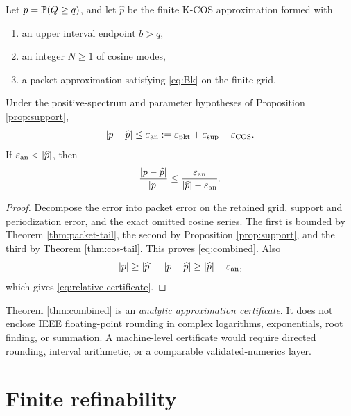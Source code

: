 \begin{theorem}
\label{thm:combined}
Let $p=\mathbb P(Q\ge q)$, and let $\widehat p$ be the finite K-COS approximation formed with
\begin{enumerate}[label=(\roman*)]
\item an upper interval endpoint $b>q$,
\item an integer $N\ge1$ of cosine modes,
\item a packet approximation satisfying \eqref{eq:Bk} on the finite grid.
\end{enumerate}
Under the positive-spectrum and parameter hypotheses of Proposition \ref{prop:support},
\begin{equation}
|p-\widehat p|
\le
\varepsilon_{\mathrm{an}}
:=\varepsilon_{\mathrm{pkt}}+\varepsilon_{\mathrm{sup}}+\varepsilon_{\mathrm{COS}}.
\label{eq:combined}
\end{equation}
If $\eps_{\mathrm{an}}<|\widehat p|$, then
\begin{equation}
\frac{|p-\widehat p|}{|p|}
\le
\frac{\varepsilon_{\mathrm{an}}}
{|\widehat p|-\varepsilon_{\mathrm{an}}}.
\label{eq:relative-certificate}
\end{equation}
\end{theorem}

\begin{proof}
Decompose the error into packet error on the retained grid, support and periodization error, and the exact omitted cosine series. The first is bounded by Theorem \ref{thm:packet-tail}, the second by Proposition \ref{prop:support}, and the third by Theorem \ref{thm:cos-tail}. This proves \eqref{eq:combined}. Also
\[
|p|\ge |\widehat p|-|p-\widehat p|
\ge |\widehat p|-\varepsilon_{\mathrm{an}},
\]
which gives \eqref{eq:relative-certificate}.
\end{proof}

\begin{remark}\label{claim:final-26-12}
Theorem \ref{thm:combined} is an \emph{analytic approximation certificate}. It does not enclose IEEE floating-point rounding in complex logarithms, exponentials, root finding, or summation. A machine-level certificate would require directed rounding, interval arithmetic, or a comparable validated-numerics layer.
\end{remark}

\section{Finite refinability}

